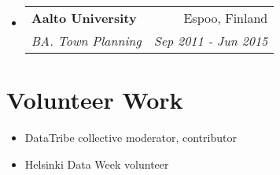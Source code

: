 \documentclass[a4paper,11pt]{article}
\makeatletter
\newcommand{\resumeItem}[1]{
	\item\small{#1}
}
\newcommand{\resumeItemListStart}{\begin{itemize}[rightmargin=0.11in]}
\newcommand{\resumeItemListEnd}{\end{itemize}}
\newcommand{\resumeTrioHeading}[3]{
	\item\small{
		\begin{tabular*}{0.96\textwidth}[t]{
				l@{\extracolsep{\fill}}c@{\extracolsep{\fill}}r
			}
			\textbf{#1} & \textit{#2} & #3
		\end{tabular*}
	}
}
\newcommand{\resumeQuadHeading}[4]{
	\item
	\begin{tabular*}{0.96\textwidth}[t]{l@{\extracolsep{\fill}}r}
		\textbf{#1} & #2 \\
		\textit{\small#3} & \textit{\small #4} \\
	\end{tabular*}
}
\newcommand{\resumeHeadingListStart}{
	\begin{itemize}[leftmargin=0.15in, label={}]
	}
\newcommand{\resumeHeadingListEnd}{\end{itemize}}
\makeatother
\begin{document}
	\resumeHeadingListStart{}
	\resumeQuadHeading{Aalto University}{Espoo, Finland}
	{BA. Town Planning}{Sep 2011 - Jun 2015}
	\resumeHeadingListEnd{}
	
	
	
%	
	
	
	
	\section{Volunteer Work}
	\resumeItemListStart{}
	\resumeItem{DataTribe collective moderator, contributor}
	\resumeItem{Helsinki Data Week volunteer}

	\resumeItemListEnd{}
	
\end{document}
